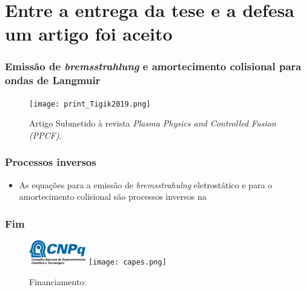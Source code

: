 \documentclass[10pt,aspectratio=1610,lualatex]{beamer}
\begin{document}
\section*{Entre a entrega da tese e a defesa um artigo foi aceito}
\begin{frame}
  \frametitle{Emissão de \emph{bremsstrahlung} e amortecimento colisional
    para ondas de Langmuir}
  \begin{figure}
    \centering \texttt{[image: print\_Tigik2019.png]}
   \caption*{Artigo Submetido à revista \emph{Plasma Physics and Controlled
      Fusion (PPCF)}.}
  \end{figure}
\end{frame}

\begin{frame}
  \frametitle{Processos inversos}
  \begin{itemize}
  \item As equações para a emissão de \emph{bremsstrahulng} eletrostático
    e para o amortecimento colisional são processos inversos na 
  \end{itemize}
\end{frame}

\begin{frame}
  \frametitle{Fim}
  \vspace{1.2cm}

  \vspace{1.2cm}

  \begin{figure}
    \caption*{Financiamento:}
    \centering
    \includegraphics[width=0.22\textwidth]{cnpq.png}
    \hspace{1cm} \texttt{[image: capes.png]}
  \end{figure}
\end{frame}
\end{document}

